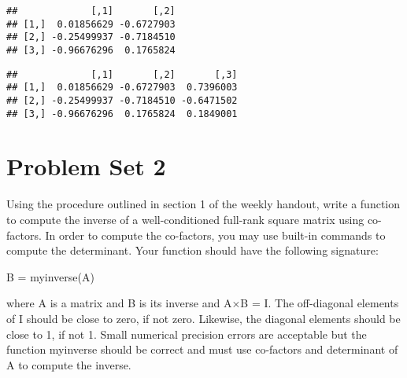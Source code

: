 \documentclass[]{article}
\newenvironment{Shaded}{\begin{snugshade}}{\end{snugshade}}
\newcommand{\KeywordTok}[1]{\textcolor[rgb]{0.13,0.29,0.53}{\textbf{{#1}}}}
\newcommand{\DataTypeTok}[1]{\textcolor[rgb]{0.13,0.29,0.53}{{#1}}}
\newcommand{\DecValTok}[1]{\textcolor[rgb]{0.00,0.00,0.81}{{#1}}}
\newcommand{\StringTok}[1]{\textcolor[rgb]{0.31,0.60,0.02}{{#1}}}
\newcommand{\NormalTok}[1]{{#1}}
\begin{document}
\begin{Shaded}
\end{Shaded}

\begin{verbatim}
##             [,1]       [,2]
## [1,]  0.01856629 -0.6727903
## [2,] -0.25499937 -0.7184510
## [3,] -0.96676296  0.1765824
\end{verbatim}

\begin{Shaded}
\end{Shaded}

\begin{verbatim}
##             [,1]       [,2]       [,3]
## [1,]  0.01856629 -0.6727903  0.7396003
## [2,] -0.25499937 -0.7184510 -0.6471502
## [3,] -0.96676296  0.1765824  0.1849001
\end{verbatim}

\newpage

\section{Problem Set 2}\label{problem-set-2}

Using the procedure outlined in section 1 of the weekly handout, write a
function to compute the inverse of a well-conditioned full-rank square
matrix using co-factors. In order to compute the co-factors, you may use
built-in commands to compute the determinant. Your function should have
the following signature:

B = myinverse(A)

where A is a matrix and B is its inverse and A×B = I. The off-diagonal
elements of I should be close to zero, if not zero. Likewise, the
diagonal elements should be close to 1, if not 1. Small numerical
precision errors are acceptable but the function myinverse should be
correct and must use co-factors and determinant of A to compute the
inverse.
\end{document}

